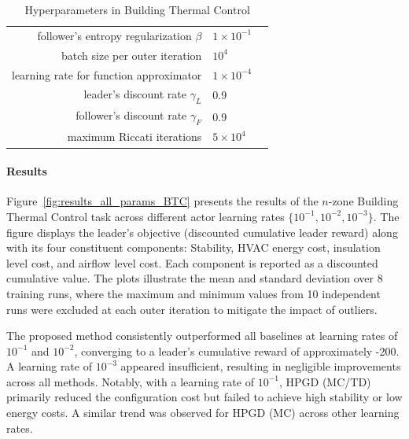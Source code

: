 \documentclass[letterpaper]{article} %
\begin{document}
\begin{table}[t]
    \centering
    \begin{tabular}{rll}\toprule
        follower's entropy regularization $\beta$ & $1\times10^{-1}$\\
        batch size per outer iteration & $10^4$\\
        learning rate for function approximator & $1\times10^{-4}$\\
        leader’s discount rate $\gamma_L$ & 0.9\\
        follower’s discount rate $\gamma_F$ & 0.9\\
        maximum Riccati iterations & $5\times 10^4$\\ \bottomrule
    \end{tabular}
    \caption{Hyperparameters in Building Thermal Control}
    \label{tab:params_lqr_cmdp}
\end{table}

\paragraph{Results}
Figure~\ref{fig:results_all_params_BTC} presents the results of the $n$-zone Building Thermal Control task across different actor learning rates $\{10^{-1}, 10^{-2}, 10^{-3}\}$. The figure displays the leader's objective (discounted cumulative leader reward) along with its four constituent components: Stability, HVAC energy cost, insulation level cost, and airflow level cost. Each component is reported as a discounted cumulative value. The plots illustrate the mean and standard deviation over 8 training runs, where the maximum and minimum values from 10 independent runs were excluded at each outer iteration to mitigate the impact of outliers.

The proposed method consistently outperformed all baselines at learning rates of $10^{-1}$ and $10^{-2}$, converging to a leader's cumulative reward of approximately -200. A learning rate of $10^{-3}$ appeared insufficient, resulting in negligible improvements across all methods. Notably, with a learning rate of $10^{-1}$, \textsc{HPGD (MC/TD)} primarily reduced the configuration cost but failed to achieve high stability or low energy costs. A similar trend was observed for \textsc{HPGD (MC)} across other learning rates.
\end{document}
